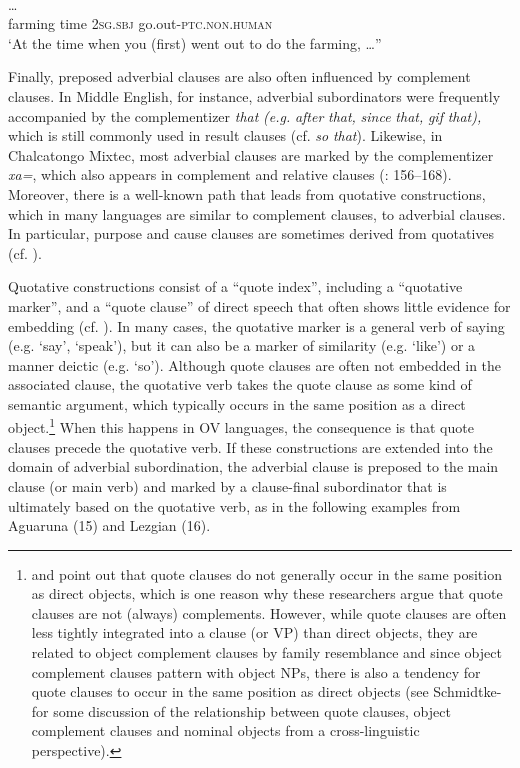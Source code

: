 \documentclass[output=paper]{langsci/langscibook}
\begin{document}
\ea\label{ex:key:}
\\
 …\\
       farming  time   2\textsc{sg.sbj}  go.out-\textsc{ptc.non.human} \\
\glt   `At the time when you (first) went out to do the farming, …”
\z

Finally, preposed adverbial clauses are also often influenced by complement clauses. In Middle English, for instance, adverbial subordinators were frequently accompanied by the complementizer \textit{that} \textit{(e.g.} \textit{after} \textit{that,} \textit{since} \textit{that,} \textit{gif} \textit{that),} which is still commonly used in result clauses (cf. \textit{so} \textit{that}). Likewise, in Chalcatongo Mixtec, most adverbial clauses are marked by the complementizer \textit{xa=}, which also appears in complement and relative clauses (\citealt{Macaulay1996}: 156--168). Moreover, there is a well-known path that leads from quotative constructions, which in many languages are similar to complement clauses, to adverbial clauses. In particular, purpose and cause clauses are sometimes derived from quotatives (cf. \citealt{Güldemann2008}). 

Quotative constructions consist of a “quote index”, including a “quotative marker”, and a “quote clause” of direct speech that often shows little evidence for embedding (cf. \citealt{Güldemann2008}). In many cases, the quotative marker is a general verb of saying (e.g. ‘say’, ‘speak’), but it can also be a marker of similarity (e.g. ‘like’) or a manner deictic (e.g. ‘so’). Although quote clauses are often not embedded in the associated clause, the quotative verb takes the quote clause as some kind of semantic argument, which typically occurs in the same position as a direct object.\footnote{\citet{Munro1982} and \citet{Güldemann2008} point out that quote clauses do not generally occur in the same position as direct objects, which is one reason why these researchers argue that quote clauses are not (always) complements. However, while quote clauses are often less tightly integrated into a clause (or VP) than direct objects, they are related to object complement clauses by family resemblance and since object complement clauses pattern with object NPs, there is also a tendency for quote clauses to occur in the same position as direct objects (see Schmidtke-\citealt{BodeDiessel2017} for some discussion of the relationship between quote clauses, object complement clauses and nominal objects from a cross-linguistic perspective).} When this happens in OV languages, the consequence is that quote clauses precede the quotative verb. If these constructions are extended into the domain of adverbial subordination, the adverbial clause is preposed to the main clause (or main verb) and marked by a clause-final subordinator that is ultimately based on the quotative verb, as in the following examples from Aguaruna (15) and Lezgian (16).
\end{document}
